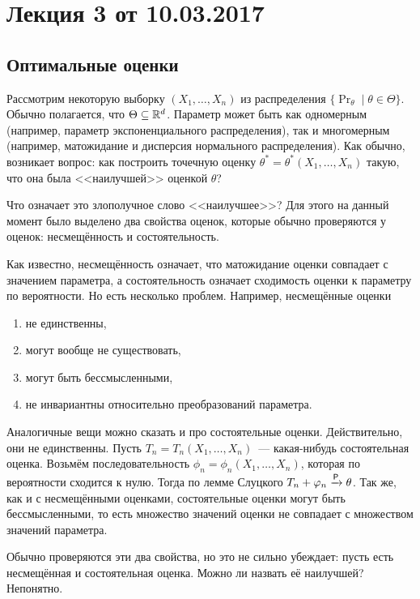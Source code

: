 \section{Лекция 3 от 10.03.2017}
\subsection{Оптимальные оценки}
Рассмотрим некоторую выборку \((X_{1}, \dots, X_{n})\) из распределения 
\(\{\Pr_{\theta} \mid \theta \in \Theta\}\). Обычно полагается, что \(\Theta 
\subseteq \mathbb{R}^{d}\). Параметр может быть как одномерным (например, параметр 
экспоненциального распределения), так и многомерным (например, матожидание и 
дисперсия нормального распределения). Как обычно, возникает вопрос: как 
построить точечную оценку \(\theta^{*} = \theta^{*}(X_{1}, \dots, X_{n})\) 
такую, что она была <<наилучшей>> оценкой \(\theta\)?

Что означает это злополучное слово <<наилучшее>>? Для этого на данный момент 
было выделено два свойства оценок, которые обычно проверяются у оценок: 
несмещённость и состоятельность.

Как известно, несмещённость означает, что матожидание оценки совпадает с 
значением параметра, а состоятельность означает сходимость оценки к параметру 
по вероятности. Но есть несколько проблем. Например, несмещённые оценки
\begin{enumerate}
	\item не единственны,
	\item могут вообще не существовать,
	\item могут быть бессмысленными,
	\item не инвариантны относительно преобразований параметра.
\end{enumerate}

Аналогичные вещи можно сказать и про состоятельные оценки. Действительно, они 
не единственны. Пусть \(T_{n} = T_{n}(X_{1}, \dots, X_{n})\)~--- какая-нибудь 
состоятельная оценка. Возьмём последовательность \(\phi_{n} = \phi_{n}(X_{1}, 
\dots, X_{n})\), которая по вероятности сходится к нулю. Тогда по лемме Слуцкого
\(T_{n} + \phi_{n} \prto \theta\). Так же, как и с несмещёнными оценками, 
состоятельные оценки могут быть бессмысленными, то есть множество значений 
оценки не совпадает с множеством значений параметра.

Обычно проверяются эти два свойства, но это не сильно убеждает: пусть есть 
несмещённая и состоятельная оценка. Можно ли назвать её наилучшей? 
Непонятно.

